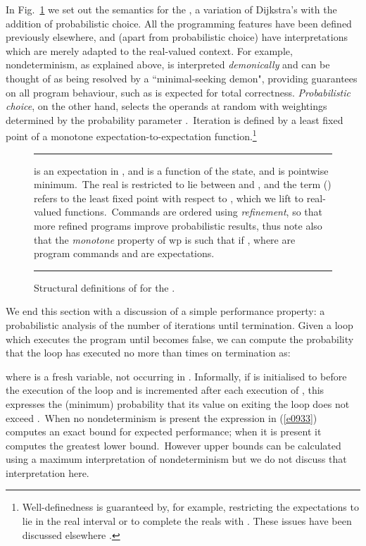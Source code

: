 \documentclass[numbers,copyright,creativecommons]{eptcs}
\newcommand{\Eqn}[1]{(\ref{#1})}
\newcommand{\figg}[1]{Fig.~\ref{#1}}
\newenvironment{Fig}{\begin{figure}[h]\small\rule{\textwidth}{.02cm}}{\rule{\textwidth}{.02cm}\end{figure}}
\begin{document}
In \figg{f0604} we set out the semantics for the , a variation of Dijkstra's
 with the addition of  probabilistic choice.  All the programming
 features have been defined previously
elsewhere, and (apart from probabilistic choice) have interpretations which are merely
adapted to the real-valued context. For example,
nondeterminism, as explained above, is interpreted \emph{demonically}
and  can be thought of as being resolved by a ``minimal-seeking demon",
providing
guarantees on all program behaviour, such as is expected for total correctness.
 \emph{Probabilistic choice}, on the other hand, selects the operands
at random with weightings determined by the probability parameter .\ Iteration is defined by a least fixed point of a monotone expectation-to-expectation function.\footnote{Well-definedness is guaranteed by, for example, restricting the expectations to lie in the real interval  or to complete the reals with . These issues have been discussed elsewhere \cite{ARP}.}


\begin{Fig}{
{\small

 is an expectation in , and   is a function of the state,
and  is pointwise minimum.\ The real  is restricted to lie between  and , and the term () refers to the least fixed point with respect to , which we lift to real-valued functions.\ Commands are ordered using \emph{refinement}, so that more refined programs
improve probabilistic results, thus 
note also that the {\it monotone} property of wp is such that if ,
where  are program commands and  are expectations.
}}

\caption{Structural definitions of  for  the .}\label{f0604}
\end{Fig}






We end this section with a discussion of  a simple performance property: a probabilistic analysis of the number of iterations until termination.  Given a loop  which executes the program  until  becomes false, we can compute the probability that the loop has executed no more than  times on termination as:


where  is a fresh variable, not occurring in . Informally, if  is initialised to  before the execution of the loop and is incremented after each execution of , this expresses the (minimum) probability that its value on exiting the loop does not exceed .\ When no nondeterminism is present the expression in \Eqn{e0933} computes an exact bound for expected performance; when it is present it computes the greatest lower bound.\ However upper bounds can be calculated using a maximum interpretation of nondeterminism but we do not discuss that interpretation here.
\end{document}
